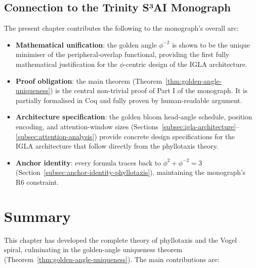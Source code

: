 \subsection{Connection to the Trinity S³AI Monograph}
\label{subsec:monograph-connection}

The present chapter contributes the following to the monograph's
overall arc:
\begin{itemize}
  \item \textbf{Mathematical unification}: the golden angle $\phi^{-2}$
        is shown to be the unique minimiser of the peripheral-overlap
        functional, providing the first fully mathematical justification
        for the $\phi$-centric design of the IGLA architecture.

  \item \textbf{Proof obligation}: the main theorem
        (Theorem~\ref{thm:golden-angle-uniqueness}) is the central
        non-trivial proof of Part I of the monograph.  It is partially
        formalised in Coq and fully proven by human-readable argument.

  \item \textbf{Architecture specification}: the golden bloom head-angle
        schedule, position encoding, and attention-window sizes
        (Sections~\ref{subsec:igla-architecture}--\ref{subsec:attention-analysis})
        provide concrete design specifications for the IGLA architecture
        that follow directly from the phyllotaxis theory.

  \item \textbf{Anchor identity}: every formula traces back to
        $\phi^2 + \phi^{-2} = 3$ (Section~\ref{subsec:anchor-identity-phyllotaxis}),
        maintaining the monograph's R6 constraint.
\end{itemize}

\section{Summary}
\label{sec:bloom-summary}

This chapter has developed the complete theory of phyllotaxis and the
Vogel spiral, culminating in the golden-angle uniqueness theorem
(Theorem~\ref{thm:golden-angle-uniqueness}).  The main contributions
are:

